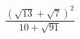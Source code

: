 \begin{ex}
	\begin{condition}
		\( \dfrac{(\sqrt{13}+\sqrt{7})^2}{10+\sqrt{91}} \)
	\end{condition}
\end{ex}